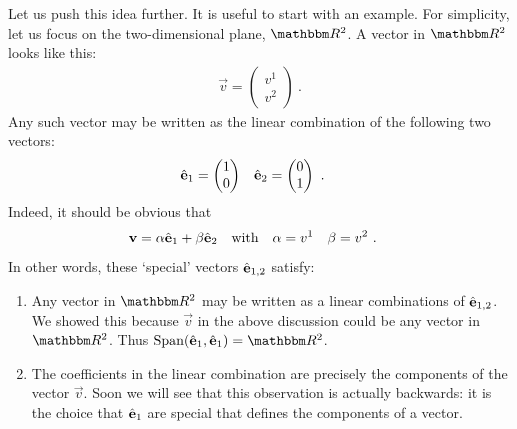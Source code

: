 \documentclass[12pt]{article}
\begin{document}
Let us push this idea further. It is useful to start with an example. For simplicity, let us focus on the two-dimensional plane, $\RR ^2$. A vector in $\RR ^2$ looks like this:
\begin{align}
    \vec{v} =
    \begin{pmatrix}
        v^1 \\ v^2
    \end{pmatrix} \ .
    \label{eq:v:v1:v2}
\end{align}
Any such vector may be written as the linear combination of the following two vectors:
\begin{align}
    {\hat{\mathbf{e}}}_1 &=
    \begin{pmatrix}
        1 \\ 0
    \end{pmatrix}
    &
    {\hat{\mathbf{e}}}_2 &=
    \begin{pmatrix}
        0 \\ 1
    \end{pmatrix} \ .
\end{align}
Indeed, it should be obvious that 
\begin{align}
    \mathbf{v} &= \alpha {\hat{\mathbf{e}}}_1 + \beta {\hat{\mathbf{e}}}_2
    & \textnormal{with}&
    &\alpha &= v^1
    &\beta &= v^2 \ .
    \label{eq:natural:cartesian:basis}
\end{align}
In other words, these `special' vectors ${\hat{\mathbf{e}}}_{1,2}$ satisfy:
\begin{enumerate}
    \item Any vector in $\RR ^2$ may be written as a linear combinations of ${\hat{\mathbf{e}}}_{1,2}$. We showed this because $\vec{v}$ in the above discussion could be any vector in $\RR ^2$. Thus $\text{Span}({\bas{e}}_{1},{\bas{e}}_{1})=\RR ^2$.
    \item The coefficients in the linear combination are precisely the components of the vector $\vec{v}$. Soon we will see that this observation is actually backwards: it is the choice that ${\hat{\mathbf{e}}}_{1}$ are special that defines the components of a vector.
\end{enumerate}
\end{document}
